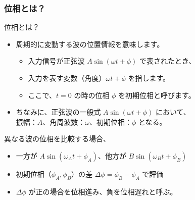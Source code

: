 \documentclass[12pt, dvipdfmx]{beamer}
\begin{document}
\begin{frame}
	\frametitle{位相とは？}
		\begin{block}{位相とは？}
			\begin{itemize}
				\item 周期的に変動する波の位置情報を意味します。
				\begin{itemize}
					\item 入力信号が正弦波 $A \sin (\omega t + \phi)$ で表されたとき、
					\item 入力を表す変数（角度）$\omega t + \phi$ を指します。
					\item ここで、$t=0$ の時の位相 $\phi$ を初期位相と呼びます。
				\end{itemize}
				\item ちなみに、正弦波の一般式 $A \sin (\omega t + \phi)$ において、\\
				振幅：$A$、角周波数：$\omega$、初期位相：$\phi$ となる。
			\end{itemize}
		\end{block}

		\begin{alertblock}{異なる波の位相を比較する場合、}
			\begin{itemize}
				\item 一方が $A \sin (\omega_A t + \phi_A)$、他方が $B \sin (\omega_B t + \phi_B)$  
				\item 初期位相（$\phi_A, \phi_B$）の差 $\Delta \phi = \phi_B - \phi_A$ で評価
				\item $\Delta \phi$ が正の場合を位相進み、負を位相遅れと呼ぶ。
			\end{itemize}
		\end{alertblock}
\end{frame}

\end{document}
